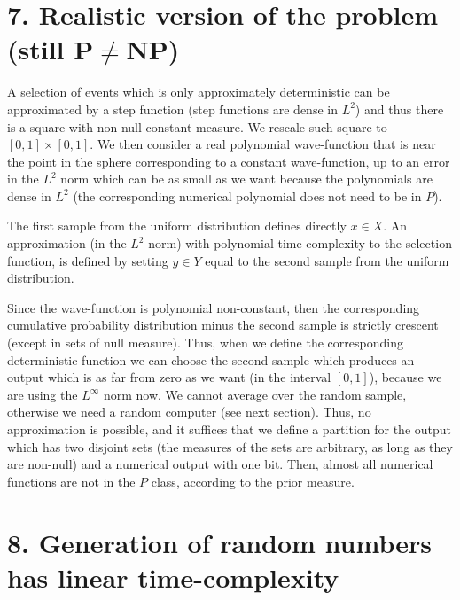 \documentclass[11pt]{book}
\begin{document}
\hypertarget{realistic-version-of-the-problem-still-pneqnp}{%
\section{\texorpdfstring{7. Realistic version of the problem (still
P\(\neq\)NP)}{7. Realistic version of the problem (still P\textbackslash neqNP)}}\label{realistic-version-of-the-problem-still-pneqnp}}

A selection of events which is only approximately deterministic can be
approximated by a step function (step functions are dense in \(L^2\))
and thus there is a square with non-null constant measure. We rescale
such square to \([0,1]\times[0,1]\). We then consider a real polynomial
wave-function that is near the point in the sphere corresponding to a
constant wave-function, up to an error in the \(L^2\) norm which can be
as small as we want because the polynomials are dense in \(L^2\) (the
corresponding numerical polynomial does not need to be in \(P\)).

The first sample from the uniform distribution defines directly
\(x\in X\). An approximation (in the \(L^2\) norm) with polynomial
time-complexity to the selection function, is defined by setting
\(y\in Y\) equal to the second sample from the uniform distribution.

Since the wave-function is polynomial non-constant, then the
corresponding cumulative probability distribution minus the second
sample is strictly crescent (except in sets of null measure). Thus, when
we define the corresponding deterministic function we can choose the
second sample which produces an output which is as far from zero as we
want (in the interval \([0,1]\)), because we are using the \(L^\infty\)
norm now. We cannot average over the random sample, otherwise we need a
random computer (see next section). Thus, no approximation is possible,
and it suffices that we define a partition for the output which has two
disjoint sets (the measures of the sets are arbitrary, as long as they
are non-null) and a numerical output with one bit. Then, almost all
numerical functions are not in the \(P\) class, according to the prior
measure.

\hypertarget{generation-of-random-numbers-has-linear-time-complexity}{%
\section{8. Generation of random numbers has linear
time-complexity}\label{generation-of-random-numbers-has-linear-time-complexity}}
\end{document}
